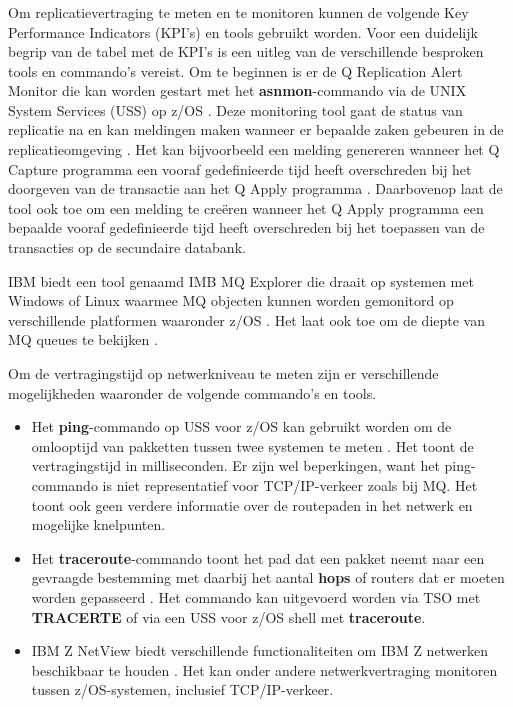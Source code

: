 \subsubsection{}
\label{sec:asynchrone-log-replicatie-meten-replicatievertraging}

Om replicatievertraging te meten en te monitoren kunnen de volgende Key Performance Indicators (KPI's) en tools gebruikt worden.
Voor een duidelijk begrip van de tabel met de KPI's is een uitleg van de verschillende besproken tools en commando's vereist.
Om te beginnen is er de Q Replication Alert Monitor  die kan worden gestart met het \textbf{asnmon}-commando via de UNIX System Services (USS) op z/OS \autocite{ibm_2026_asnmon}.
Deze monitoring tool gaat de status van replicatie na en kan meldingen maken wanneer er bepaalde zaken gebeuren in de replicatieomgeving \autocite{ibm_2026_q_replication_alert_monitor}.
Het kan bijvoorbeeld een melding genereren wanneer het Q Capture programma een vooraf gedefinieerde tijd heeft overschreden bij het doorgeven van de transactie aan het Q Apply programma \autocite{ibm_2026_alert_conditions_replication_alert_monitor}.
Daarbovenop laat de tool ook toe om een melding te creëren wanneer het Q Apply programma een bepaalde vooraf gedefinieerde tijd heeft overschreden bij het toepassen van de transacties op de secundaire databank.

IBM biedt een tool genaamd IMB MQ Explorer die draait op systemen met Windows of Linux waarmee MQ objecten kunnen worden gemonitord op verschillende platformen waaronder z/OS \autocite{ibm_2026_ibm_mq_explorer}. 
Het laat ook toe om de diepte van MQ queues te bekijken \autocite{ibm_2026_displaying_queue_channel_monitoring_data}.

Om de vertragingstijd op netwerkniveau te meten zijn er verschillende mogelijkheden waaronder de volgende commando's en tools.
\begin{itemize}
    \item Het \textbf{ping}-commando op USS voor z/OS kan gebruikt worden om de omlooptijd van pakketten tussen twee systemen te meten \autocite{ibm_2026_the_uss_zos_ping_command}. Het toont de vertragingstijd in milliseconden. Er zijn wel beperkingen, want het ping-commando is niet representatief voor TCP/IP-verkeer zoals bij MQ. Het toont ook geen verdere informatie over de routepaden in het netwerk en mogelijke knelpunten.
    \item Het \textbf{traceroute}-commando toont het pad dat een pakket neemt naar een gevraagde bestemming met daarbij het aantal \textbf{hops} of routers dat er moeten worden gepasseerd \autocite{ibm_2026_using_the_traceroute_command}. Het commando kan uitgevoerd worden via TSO met \textbf{TRACERTE} of via een USS voor z/OS shell met \textbf{traceroute}.
    \item IBM Z NetView biedt verschillende functionaliteiten om IBM Z netwerken beschikbaar te houden \autocite{ibm_2026_ibm_z_netview}. Het kan onder andere netwerkvertraging monitoren tussen z/OS-systemen, inclusief TCP/IP-verkeer.
\end{itemize} 

